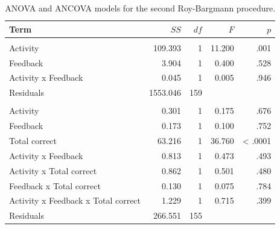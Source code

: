 \begin{table}

\caption{\label{tab:rb2Table}\label{rb2-table}ANOVA and ANCOVA models for the second Roy-Bargmann
                     procedure.}
\centering
\begin{tabular}[t]{lrrrr}
\toprule
Term & $SS$ & $df$ & $F$ & $p$\\
\midrule
\addlinespace[0.3em]
\multicolumn{5}{l}{\textbf{ANOVA}}\\
\hspace{1em}Activity & 109.393 & 1 & 11.200 & .001\\
\hspace{1em}Feedback & 3.904 & 1 & 0.400 & .528\\
\hspace{1em}Activity x Feedback & 0.045 & 1 & 0.005 & .946\\
\hspace{1em}Residuals & 1553.046 & 159 &  & \\
\addlinespace[0.3em]
\multicolumn{5}{l}{\textbf{ANCOVA}}\\
\hspace{1em}Activity & 0.301 & 1 & 0.175 & .676\\
\hspace{1em}Feedback & 0.173 & 1 & 0.100 & .752\\
\hspace{1em}Total correct & 63.216 & 1 & 36.760 & < .0001\\
\hspace{1em}Activity x Feedback & 0.813 & 1 & 0.473 & .493\\
\hspace{1em}Activity x Total correct & 0.862 & 1 & 0.501 & .480\\
\hspace{1em}Feedback x Total correct & 0.130 & 1 & 0.075 & .784\\
\hspace{1em}Activity x Feedback x Total correct & 1.229 & 1 & 0.715 & .399\\
\hspace{1em}Residuals & 266.551 & 155 &  & \\
\bottomrule
\end{tabular}
\end{table}


